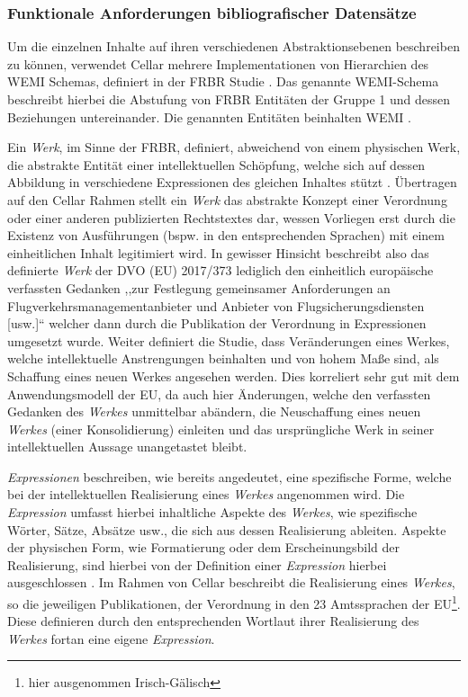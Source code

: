     \subsubsection{Funktionale Anforderungen bibliografischer Datensätze}\label{frbr}
    
Um die einzelnen Inhalte auf ihren verschiedenen Abstraktionsebenen beschreiben zu können, verwendet Cellar mehrere Implementationen von Hierarchien des \acs{WEMI} Schemas, definiert in der \ac{FRBR}  Studie \cite[S. 29f]{eu_cellar}.
Das genannte \acs{WEMI}-Schema beschreibt hierbei die Abstufung von \ac{FRBR} Entitäten der Gruppe 1 und dessen Beziehungen untereinander. 
Die genannten Entitäten beinhalten \ac{WEMI} \cite[12]{eu_frbr}.

Ein \textit{Werk}, im Sinne der \ac{FRBR}, definiert, abweichend von einem physischen Werk, die abstrakte Entität einer intellektuellen Schöpfung, welche sich auf dessen Abbildung in verschiedene Expressionen des gleichen Inhaltes stützt \cite[S. 16f]{eu_frbr}.
Übertragen auf den Cellar Rahmen stellt ein \textit{Werk} das abstrakte Konzept einer Verordnung oder einer anderen publizierten Rechtstextes dar, wessen Vorliegen erst durch die Existenz von Ausführungen (bspw. in den entsprechenden Sprachen) mit einem einheitlichen Inhalt legitimiert wird. 
In gewisser Hinsicht beschreibt also das definierte \textit{Werk} der \acs{DVO} (\acs{EU}) 2017/373 lediglich den einheitlich europäische verfassten Gedanken ,,zur Festlegung gemeinsamer Anforderungen an Flugverkehrsmanagementanbieter und Anbieter von Flugsicherungsdiensten [usw.]`` welcher dann durch die Publikation der Verordnung in Expressionen umgesetzt wurde.
Weiter definiert die Studie, dass Veränderungen eines Werkes, welche intellektuelle Anstrengungen beinhalten und von hohem Maße sind, als Schaffung eines neuen Werkes angesehen werden. \cite[17]{eu_frbr} 
Dies korreliert sehr gut mit dem Anwendungsmodell der \ac{EU}, da auch hier Änderungen, welche den verfassten Gedanken des \textit{Werkes} unmittelbar abändern, die Neuschaffung eines neuen \textit{Werkes} (einer Konsolidierung) einleiten und das ursprüngliche Werk in seiner intellektuellen Aussage unangetastet bleibt.

\medskip
\textit{Expressionen} beschreiben, wie bereits angedeutet, eine spezifische Forme, welche bei der intellektuellen Realisierung eines \textit{Werkes} angenommen wird.
Die \textit{Expression} umfasst hierbei inhaltliche Aspekte des \textit{Werkes}, wie spezifische Wörter, Sätze, Absätze usw., die sich aus dessen Realisierung ableiten. 
Aspekte der physischen Form, wie Formatierung oder dem Erscheinungsbild der Realisierung, sind hierbei von der Definition einer \textit{Expression} hierbei ausgeschlossen \cite[S. 18f]{eu_frbr}.
Im Rahmen von Cellar beschreibt die Realisierung eines \textit{Werkes}, so die jeweiligen Publikationen, der Verordnung in den 23 Amtssprachen der EU\footnote{hier ausgenommen Irisch-Gälisch}.
Diese definieren durch den entsprechenden Wortlaut ihrer Realisierung des \textit{Werkes} fortan eine eigene \textit{Expression}.

